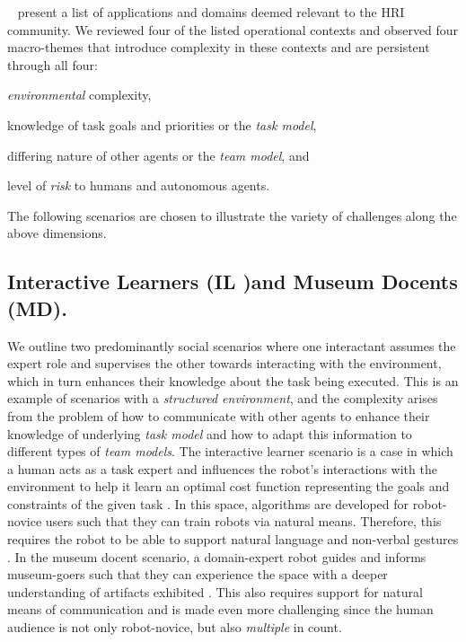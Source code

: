 \documentclass[letterpaper, 10 pt, conference]{ieeeconf}  %
\theoremstyle{definition}
\newcommand{\citet}[1]{\citeauthor{#1}~\cite{#1}}
\begin{document}
\citet{Burke2004} present a list of applications and domains deemed relevant to the HRI community.
We reviewed four of the listed operational contexts and observed four macro-themes that introduce complexity in these contexts and are persistent through all four:
\begin{enumerate*}
    \item \textit{environmental} complexity,
    \item knowledge of task goals and priorities or the \textit{task model},
    \item differing nature of other agents or the \textit{team model}, and
    \item level of \textit{risk} to humans and autonomous agents.
\end{enumerate*}
The following scenarios are chosen to illustrate the variety of challenges along the above dimensions. 

\subsection{Interactive Learners (IL )and Museum Docents (MD).}
\label{subsec:il-and-md}
        We outline two predominantly social scenarios where one interactant assumes the expert role and supervises the other towards interacting with the environment, which in turn enhances their knowledge about the task being executed. This is an example of scenarios with a \textit{structured environment}, and the complexity arises from the problem of how to communicate with other agents to enhance their knowledge of underlying \textit{task model} and how to adapt this information to different types of \textit{team models}.
        The interactive learner scenario is a case in which a human acts as a task expert and influences the robot's interactions with the environment to help it learn an optimal cost function representing the goals and constraints of the given task \cite{fitzgerald2018human}.
        In this space, algorithms are developed for robot-novice users such that they can train robots via natural means. Therefore, this requires the robot to be able to support natural language and non-verbal gestures \cite{kidd2006sociable}.
        In the museum docent scenario, a domain-expert robot guides and informs museum-goers such that they can experience the space with a deeper understanding of artifacts exhibited \cite{Thrun1999Minerva, Burgard1999Mesuem, Burke2004}. 
        This also requires support for natural means of communication and is made even more challenging since the human audience is not only robot-novice, but also \textit{multiple} in count.
        
\end{document}
